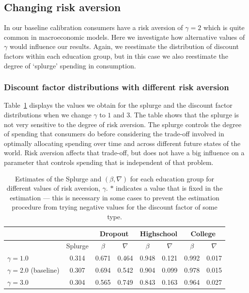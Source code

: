 \documentclass[../HAFiscal]{subfiles}
\begin{document}
\FloatBarrier
\subsection{Changing risk aversion} 
\label{sec:robust_gamma} 

In our baseline calibration consumers have a risk aversion of $\gamma=2$ which is quite common in macroeconomic models. Here we investigate how alternative values of $\gamma$ would influence our results. Again, we reestimate the distribution of discount factors within each education group, but in this case we also reestimate the degree of `splurge' spending in consumption. 

\subsubsection{Discount factor distributions with different risk aversion}
\label{sec:robust_gamma_estim}

Table~\ref{tab:robustness_gamma} displays the values we obtain for the splurge and the discount factor distributions when we change $\gamma$ to $1$ and $3$. The table shows that the splurge is not very sensitive to the degree of risk aversion. The splurge controls the degree of spending that consumers do before considering the trade-off involved in optimally allocating spending over time and across different future states of the world. Risk aversion affects that trade-off, but does not have a big influence on a parameter that controls spending that is independent of that problem. 

\begin{table}[t]
\begin{center}
\begin{tabular}{lc|cccccc} 
	\toprule
	& & \multicolumn{2}{c}{Dropout} & \multicolumn{2}{c}{Highschool} & \multicolumn{2}{c}{College} \\ \midrule 
	& Splurge & $\beta$ & $\nabla$ & $\beta$ & $\nabla$ & $\beta$ & $\nabla$ \\ \midrule 
	$\gamma = 1.0$ & 0.314 & 0.671 & 0.464 & 0.948 & 0.121 & 0.992 & 0.017 \\ 
	$\gamma = 2.0$ (baseline) & 0.307 & 0.694 & 0.542 & 0.904 & 0.099 & 0.978 & 0.015 \\
	$\gamma = 3.0$ & 0.304 & 0.565 & 0.749 & 0.843 & 0.163 & 0.964 & 0.027 
	\\ \bottomrule 
\end{tabular}
\end{center}
\caption{Estimates of the Splurge and $(\beta,\nabla)$ for each education group for different values of risk aversion, $\gamma$. $*$ indicates a value that is fixed in the estimation --- this is necessary in some cases to prevent the estimation procedure from trying negative values for the discount factor of some type.}
\label{tab:robustness_gamma}
\end{table}
\end{document}
